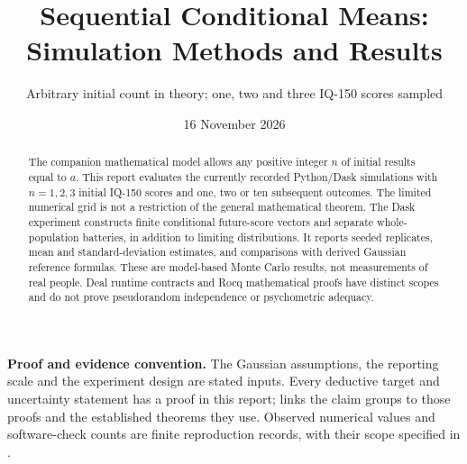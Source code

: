 
\title{Sequential Conditional Means:\\Simulation Methods and Results}
\subtitle{Arbitrary initial count in theory; one, two and three IQ-150 scores sampled}
\author{\ProjectAuthor}
\date{16 November 2026}

\renewcommand{\ProjectReportHighlights}{The recorded Python/Dask experiment samples \(1\), \(2\) or \(3\)
initial IQ-150 results and \(1\), \(2\) or \(10\) later outcomes. The
underlying conditional-Gaussian theory permits arbitrary positive
initial counts. Results are synthetic and conditional on the model.}


\frontmatter

\ProjectReportTitlePage

\begin{abstract}
The companion mathematical model allows any positive integer \(n\) of
initial results equal to \(a\). This report evaluates the currently
recorded Python/Dask simulations with \(n=1,2,3\) initial IQ-150 scores
and one, two or ten subsequent outcomes. The limited numerical grid
is not a restriction of the general mathematical theorem. The Dask experiment constructs
finite conditional future-score vectors and separate whole-population
batteries, in addition to limiting distributions. It reports seeded
replicates, mean and standard-deviation estimates, and comparisons with
derived Gaussian reference formulas. These are model-based Monte Carlo
results, not measurements of real people. Deal runtime contracts and
Rocq mathematical proofs have distinct scopes and do not prove
pseudorandom independence or psychometric adequacy.
\end{abstract}

\noindent\textbf{Proof and evidence convention.} The Gaussian assumptions,
the reporting scale and the experiment design are stated inputs. Every
deductive target and uncertainty statement has a proof in this report;
 links the claim groups to those proofs
and the established theorems they use. Observed numerical values and
software-check counts are finite reproduction records, with their scope
specified in .


